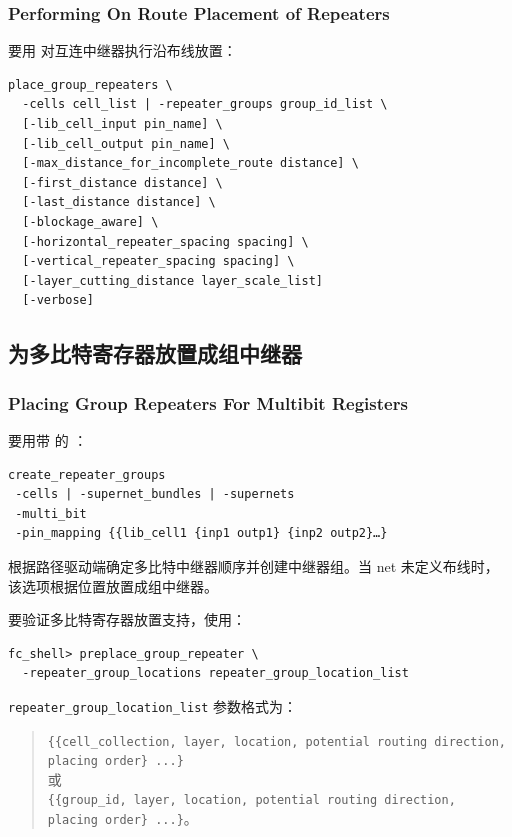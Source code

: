 \subsubsection*{Performing On Route Placement of Repeaters}

要用  对互连中继器执行沿布线放置：
\begin{lstlisting}
place_group_repeaters \
  -cells cell_list | -repeater_groups group_id_list \
  [-lib_cell_input pin_name] \
  [-lib_cell_output pin_name] \
  [-max_distance_for_incomplete_route distance] \
  [-first_distance distance] \
  [-last_distance distance] \
  [-blockage_aware] \
  [-horizontal_repeater_spacing spacing] \
  [-vertical_repeater_spacing spacing] \
  [-layer_cutting_distance layer_scale_list]
  [-verbose]
\end{lstlisting}

\subsection{为多比特寄存器放置成组中继器}
\subsubsection*{Placing Group Repeaters For Multibit Registers}

要用带 \opt{-multi\_bit} 的 ：
\begin{lstlisting}
create_repeater_groups
 -cells | -supernet_bundles | -supernets
 -multi_bit
 -pin_mapping {{lib_cell1 {inp1 outp1} {inp2 outp2}…}
\end{lstlisting}

\opt{-multi\_bit} 根据路径驱动端确定多比特中继器顺序并创建中继器组。当 net 未定义布线时，该选项根据位置放置成组中继器。

要验证多比特寄存器放置支持，使用：
\begin{lstlisting}
fc_shell> preplace_group_repeater \
  -repeater_group_locations repeater_group_location_list
\end{lstlisting}

\texttt{repeater\_group\_location\_list} 参数格式为：
\begin{quote}
\texttt{\{\{cell\_collection, layer, location, potential routing direction, placing order\} ...\}}\\
或\\
\texttt{\{\{group\_id, layer, location, potential routing direction, placing order\} ...\}}。
\end{quote}

